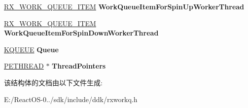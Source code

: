 \begin{DoxyCompactItemize}
\item 
\mbox{\label{struct___r_x___w_o_r_k___q_u_e_u_e___a44503e17d1dccfbc4539355d7e626f99}} 
\hyperlink{struct___r_x___w_o_r_k___q_u_e_u_e___i_t_e_m__}{R\+X\+\_\+\+W\+O\+R\+K\+\_\+\+Q\+U\+E\+U\+E\+\_\+\+I\+T\+EM} {\bfseries Work\+Queue\+Item\+For\+Spin\+Up\+Worker\+Thread}
\item 
\mbox{\label{struct___r_x___w_o_r_k___q_u_e_u_e___a403214bc0f78aef22a05f52949e53af5}} 
\hyperlink{struct___r_x___w_o_r_k___q_u_e_u_e___i_t_e_m__}{R\+X\+\_\+\+W\+O\+R\+K\+\_\+\+Q\+U\+E\+U\+E\+\_\+\+I\+T\+EM} {\bfseries Work\+Queue\+Item\+For\+Spin\+Down\+Worker\+Thread}
\item 
\mbox{\label{struct___r_x___w_o_r_k___q_u_e_u_e___a1a50d255236a78b9e2072784fe61a919}} 
\hyperlink{struct___k_q_u_e_u_e}{K\+Q\+U\+E\+UE} {\bfseries Queue}
\item 
\mbox{\label{struct___r_x___w_o_r_k___q_u_e_u_e___ab3138c23e8edffddbb3a691345cb1bae}} 
\hyperlink{struct___e_t_h_r_e_a_d}{P\+E\+T\+H\+R\+E\+AD} $\ast$ {\bfseries Thread\+Pointers}
\end{DoxyCompactItemize}


该结构体的文档由以下文件生成\+:\begin{DoxyCompactItemize}
\item 
E\+:/\+React\+O\+S-\/0../sdk/include/ddk/rxworkq.\+h\end{DoxyCompactItemize}
